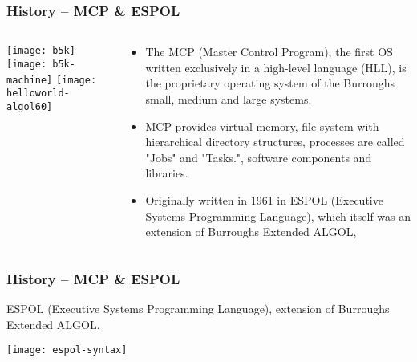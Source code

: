 \begin{frame}[plain]
	\frametitle{History -- MCP \& ESPOL}
	
	

\begin{columns}
	
	\begin{column}{.4\textwidth}
		\centering
		\texttt{[image: b5k]}
		\texttt{[image: b5k-machine]}
		\texttt{[image: helloworld-algol60]}
	\end{column}
	
	\begin{column}{.6\textwidth}
		
		
		\begin{itemize}
			\item The MCP (Master Control Program), the first OS written exclusively in a high-level language (HLL), is the proprietary operating system of the Burroughs small, medium and large systems.
			\item MCP provides virtual memory, file system with hierarchical directory structures, processes are called "Jobs" and "Tasks.", software components and libraries.
			
			\item  Originally written in 1961 in ESPOL (Executive Systems Programming Language), which itself was an extension of Burroughs Extended ALGOL,
		\end{itemize}
		
		
	\end{column}
	
	
\end{columns}

\end{frame}






\begin{frame}[plain]
	\frametitle{History -- MCP \& ESPOL}
	
	ESPOL (Executive Systems Programming Language), extension of Burroughs Extended ALGOL.
	\centering
	
	\texttt{[image: espol-syntax]}
	
\end{frame}

